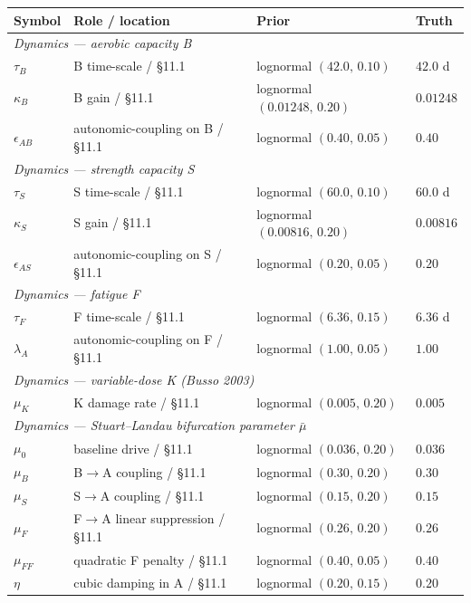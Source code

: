 \begin{center}\small
\begin{tabular}{llll}
\toprule
Symbol & Role / location & Prior & Truth \\
\midrule
\multicolumn{4}{l}{\textit{Dynamics — aerobic capacity B}} \\
\midrule
$\tau_B$ & B time-scale / §11.1 & lognormal $(42.0,\,0.10)$ & $42.0$ d \\
$\kappa_B$ & B gain / §11.1 & lognormal $(0.01248,\,0.20)$ & $0.01248$ \\
$\epsilon_{AB}$ & autonomic-coupling on B / §11.1 & lognormal $(0.40,\,0.05)$ & $0.40$ \\
\midrule
\multicolumn{4}{l}{\textit{Dynamics — strength capacity S}} \\
\midrule
$\tau_S$ & S time-scale / §11.1 & lognormal $(60.0,\,0.10)$ & $60.0$ d \\
$\kappa_S$ & S gain / §11.1 & lognormal $(0.00816,\,0.20)$ & $0.00816$ \\
$\epsilon_{AS}$ & autonomic-coupling on S / §11.1 & lognormal $(0.20,\,0.05)$ & $0.20$ \\
\midrule
\multicolumn{4}{l}{\textit{Dynamics — fatigue F}} \\
\midrule
$\tau_F$ & F time-scale / §11.1 & lognormal $(6.36,\,0.15)$ & $6.36$ d \\
$\lambda_A$ & autonomic-coupling on F / §11.1 & lognormal $(1.00,\,0.05)$ & $1.00$ \\
\midrule
\multicolumn{4}{l}{\textit{Dynamics — variable-dose K (Busso 2003)}} \\
\midrule
$\mu_K$ & K damage rate / §11.1 & lognormal $(0.005,\,0.20)$ & $0.005$ \\
\midrule
\multicolumn{4}{l}{\textit{Dynamics — Stuart--Landau bifurcation parameter $\bar\mu$}} \\
\midrule
$\mu_0$ & baseline drive / §11.1 & lognormal $(0.036,\,0.20)$ & $0.036$ \\
$\mu_B$ & B$\to$A coupling / §11.1 & lognormal $(0.30,\,0.20)$ & $0.30$ \\
$\mu_S$ & S$\to$A coupling / §11.1 & lognormal $(0.15,\,0.20)$ & $0.15$ \\
$\mu_F$ & F$\to$A linear suppression / §11.1 & lognormal $(0.26,\,0.20)$ & $0.26$ \\
$\mu_{FF}$ & quadratic F penalty / §11.1 & lognormal $(0.40,\,0.05)$ & $0.40$ \\
$\eta$ & cubic damping in A / §11.1 & lognormal $(0.20,\,0.15)$ & $0.20$ \\

\end{tabular}
\end{center}
